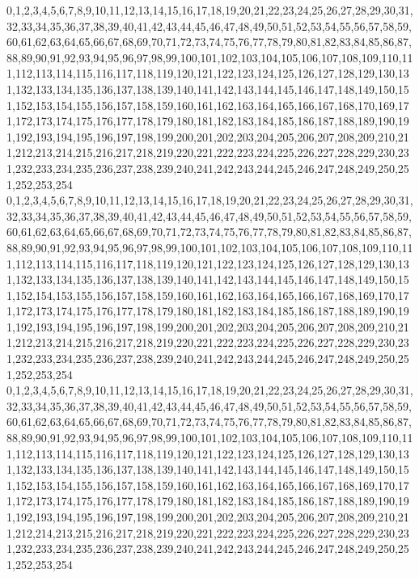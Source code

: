 \documentclass[12pt]{article}
\begin{document}
{0,1,2,3,4,5,6,7,8,9,10,11,12,13,14,15,16,17,18,19,20,21,22,23,24,25,26,27,28,29,30,31,32,33,34,35,36,37,38,39,40,41,42,43,44,45,46,47,48,49,50,51,52,53,54,55,56,57,58,59,60,61,62,63,64,65,66,67,68,69,70,71,72,73,74,75,76,77,78,79,80,81,82,83,84,85,86,87,88,89,90,91,92,93,94,95,96,97,98,99,100,101,102,103,104,105,106,107,108,109,110,111,112,113,114,115,116,117,118,119,120,121,122,123,124,125,126,127,128,129,130,131,132,133,134,135,136,137,138,139,140,141,142,143,144,145,146,147,148,149,150,151,152,153,154,155,156,157,158,159,160,161,162,163,164,165,166,167,168,170,169,171,172,173,174,175,176,177,178,179,180,181,182,183,184,185,186,187,188,189,190,191,192,193,194,195,196,197,198,199,200,201,202,203,204,205,206,207,208,209,210,211,212,213,214,215,216,217,218,219,220,221,222,223,224,225,226,227,228,229,230,231,232,233,234,235,236,237,238,239,240,241,242,243,244,245,246,247,248,249,250,251,252,253,254\\
0,1,2,3,4,5,6,7,8,9,10,11,12,13,14,15,16,17,18,19,20,21,22,23,24,25,26,27,28,29,30,31,32,33,34,35,36,37,38,39,40,41,42,43,44,45,46,47,48,49,50,51,52,53,54,55,56,57,58,59,60,61,62,63,64,65,66,67,68,69,70,71,72,73,74,75,76,77,78,79,80,81,82,83,84,85,86,87,88,89,90,91,92,93,94,95,96,97,98,99,100,101,102,103,104,105,106,107,108,109,110,111,112,113,114,115,116,117,118,119,120,121,122,123,124,125,126,127,128,129,130,131,132,133,134,135,136,137,138,139,140,141,142,143,144,145,146,147,148,149,150,151,152,154,153,155,156,157,158,159,160,161,162,163,164,165,166,167,168,169,170,171,172,173,174,175,176,177,178,179,180,181,182,183,184,185,186,187,188,189,190,191,192,193,194,195,196,197,198,199,200,201,202,203,204,205,206,207,208,209,210,211,212,213,214,215,216,217,218,219,220,221,222,223,224,225,226,227,228,229,230,231,232,233,234,235,236,237,238,239,240,241,242,243,244,245,246,247,248,249,250,251,252,253,254\\
0,1,2,3,4,5,6,7,8,9,10,11,12,13,14,15,16,17,18,19,20,21,22,23,24,25,26,27,28,29,30,31,32,33,34,35,36,37,38,39,40,41,42,43,44,45,46,47,48,49,50,51,52,53,54,55,56,57,58,59,60,61,62,63,64,65,66,67,68,69,70,71,72,73,74,75,76,77,78,79,80,81,82,83,84,85,86,87,88,89,90,91,92,93,94,95,96,97,98,99,100,101,102,103,104,105,106,107,108,109,110,111,112,113,114,115,116,117,118,119,120,121,122,123,124,125,126,127,128,129,130,131,132,133,134,135,136,137,138,139,140,141,142,143,144,145,146,147,148,149,150,151,152,153,154,155,156,157,158,159,160,161,162,163,164,165,166,167,168,169,170,171,172,173,174,175,176,177,178,179,180,181,182,183,184,185,186,187,188,189,190,191,192,193,194,195,196,197,198,199,200,201,202,203,204,205,206,207,208,209,210,211,212,214,213,215,216,217,218,219,220,221,222,223,224,225,226,227,228,229,230,231,232,233,234,235,236,237,238,239,240,241,242,243,244,245,246,247,248,249,250,251,252,253,254\\
}
\end{document}
